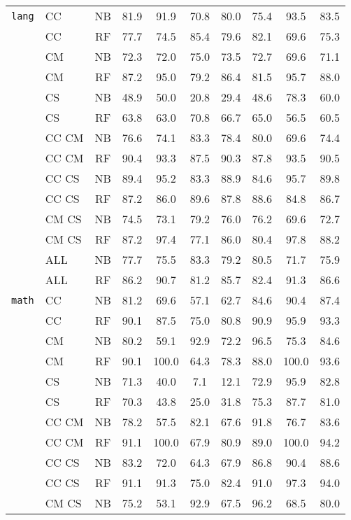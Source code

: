 {\begin{tabular}{l l c | c | c c c | c c c}
{\tt lang}
& CC & NB & 81.9 & 91.9 & 70.8 & 80.0 & 75.4 & 93.5 & 83.5 \\
& CC & RF & 77.7 & 74.5 & 85.4 & 79.6 & 82.1 & 69.6 & 75.3 \\
& CM & NB & 72.3 & 72.0 & 75.0 & 73.5 & 72.7 & 69.6 & 71.1 \\
& CM & RF & 87.2 & 95.0 & 79.2 & 86.4 & 81.5 & 95.7 & 88.0 \\
& CS & NB & 48.9 & 50.0 & 20.8 & 29.4 & 48.6 & 78.3 & 60.0 \\
& CS & RF & 63.8 & 63.0 & 70.8 & 66.7 & 65.0 & 56.5 & 60.5 \\
& CC CM & NB & 76.6 & 74.1 & 83.3 & 78.4 & 80.0 & 69.6 & 74.4 \\
& CC CM & RF & 90.4 & 93.3 & 87.5 & 90.3 & 87.8 & 93.5 & 90.5 \\
& CC CS & NB & 89.4 & 95.2 & 83.3 & 88.9 & 84.6 & 95.7 & 89.8 \\
& CC CS & RF & 87.2 & 86.0 & 89.6 & 87.8 & 88.6 & 84.8 & 86.7 \\
& CM CS & NB & 74.5 & 73.1 & 79.2 & 76.0 & 76.2 & 69.6 & 72.7 \\
& CM CS & RF & 87.2 & 97.4 & 77.1 & 86.0 & 80.4 & 97.8 & 88.2 \\
& ALL & NB & 77.7 & 75.5 & 83.3 & 79.2 & 80.5 & 71.7 & 75.9 \\
& ALL & RF & 86.2 & 90.7 & 81.2 & 85.7 & 82.4 & 91.3 & 86.6 \\
{\tt math}
& CC & NB & 81.2 & 69.6 & 57.1 & 62.7 & 84.6 & 90.4 & 87.4 \\
& CC & RF & 90.1 & 87.5 & 75.0 & 80.8 & 90.9 & 95.9 & 93.3 \\
& CM & NB & 80.2 & 59.1 & 92.9 & 72.2 & 96.5 & 75.3 & 84.6 \\
& CM & RF & 90.1 & 100.0 & 64.3 & 78.3 & 88.0 & 100.0 & 93.6 \\
& CS & NB & 71.3 & 40.0 & 7.1 & 12.1 & 72.9 & 95.9 & 82.8 \\
& CS & RF & 70.3 & 43.8 & 25.0 & 31.8 & 75.3 & 87.7 & 81.0 \\
& CC CM & NB & 78.2 & 57.5 & 82.1 & 67.6 & 91.8 & 76.7 & 83.6 \\
& CC CM & RF & 91.1 & 100.0 & 67.9 & 80.9 & 89.0 & 100.0 & 94.2 \\
& CC CS & NB & 83.2 & 72.0 & 64.3 & 67.9 & 86.8 & 90.4 & 88.6 \\
& CC CS & RF & 91.1 & 91.3 & 75.0 & 82.4 & 91.0 & 97.3 & 94.0 \\
& CM CS & NB & 75.2 & 53.1 & 92.9 & 67.5 & 96.2 & 68.5 & 80.0 \\

\end{tabular}}
